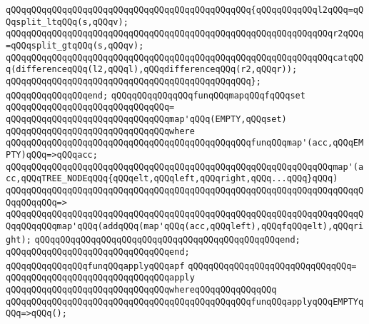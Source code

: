 \verb|qQQqqQQqqQQqqQQqqQQqqQQqqQQqqQQqqQQqqQQqqQQqqQQq{qQQqqQQqqQQql2qQQq=qQQqsplit_ltqQQq(s,qQQqv);|\newline
\verb|qQQqqQQqqQQqqQQqqQQqqQQqqQQqqQQqqQQqqQQqqQQqqQQqqQQqqQQqqQQqqQQqr2qQQq=qQQqsplit_gtqQQq(s,qQQqv);|\newline
\newline
\verb|qQQqqQQqqQQqqQQqqQQqqQQqqQQqqQQqqQQqqQQqqQQqqQQqqQQqqQQqqQQqqQQqcatqQQq(differenceqQQq(l2,qQQql),qQQqdifferenceqQQq(r2,qQQqr));|\newline
\verb|qQQqqQQqqQQqqQQqqQQqqQQqqQQqqQQqqQQqqQQqqQQqqQQq};|\newline
\verb|qQQqqQQqqQQqqQQqend;|\newline
\newline
\verb|qQQqqQQqqQQqqQQqfunqQQqmapqQQqfqQQqset|\newline
\verb|qQQqqQQqqQQqqQQqqQQqqQQqqQQqqQQq=|\newline
\verb|qQQqqQQqqQQqqQQqqQQqqQQqqQQqqQQqmap'qQQq(EMPTY,qQQqset)|\newline
\verb|qQQqqQQqqQQqqQQqqQQqqQQqqQQqqQQqwhere|\newline
\verb|qQQqqQQqqQQqqQQqqQQqqQQqqQQqqQQqqQQqqQQqqQQqqQQqfunqQQqmap'(acc,qQQqEMPTY)qQQq=>qQQqacc;|\newline
\newline
\verb|qQQqqQQqqQQqqQQqqQQqqQQqqQQqqQQqqQQqqQQqqQQqqQQqqQQqqQQqqQQqqQQqmap'(acc,qQQqTREE_NODEqQQq{qQQqelt,qQQqleft,qQQqright,qQQq...qQQq}qQQq)|\newline
\verb|qQQqqQQqqQQqqQQqqQQqqQQqqQQqqQQqqQQqqQQqqQQqqQQqqQQqqQQqqQQqqQQqqQQqqQQqqQQqqQQq=>|\newline
\verb|qQQqqQQqqQQqqQQqqQQqqQQqqQQqqQQqqQQqqQQqqQQqqQQqqQQqqQQqqQQqqQQqqQQqqQQqqQQqqQQqmap'qQQq(addqQQq(map'qQQq(acc,qQQqleft),qQQqfqQQqelt),qQQqright);|\newline
\verb|qQQqqQQqqQQqqQQqqQQqqQQqqQQqqQQqqQQqqQQqqQQqqQQqend;|\newline
\verb|qQQqqQQqqQQqqQQqqQQqqQQqqQQqqQQqend;|\newline
\newline
\verb|qQQqqQQqqQQqqQQqfunqQQqapplyqQQqapf|\newline
\verb|qQQqqQQqqQQqqQQqqQQqqQQqqQQqqQQq=|\newline
\verb|qQQqqQQqqQQqqQQqqQQqqQQqqQQqqQQqapply|\newline
\verb|qQQqqQQqqQQqqQQqqQQqqQQqqQQqqQQqwhereqQQqqQQqqQQqqQQq|\newline
\verb|qQQqqQQqqQQqqQQqqQQqqQQqqQQqqQQqqQQqqQQqqQQqqQQqfunqQQqapplyqQQqEMPTYqQQq=>qQQq();|\newline
